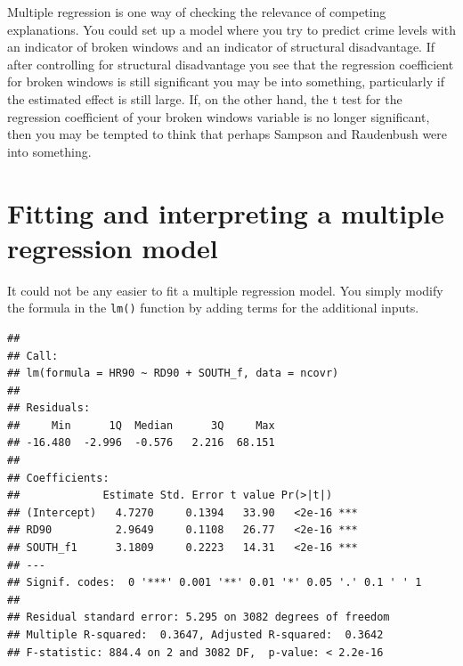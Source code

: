 \documentclass[]{book}
\newenvironment{Shaded}{\begin{snugshade}}{\end{snugshade}}
\newcommand{\DataTypeTok}[1]{\textcolor[rgb]{0.13,0.29,0.53}{#1}}
\newcommand{\DecValTok}[1]{\textcolor[rgb]{0.00,0.00,0.81}{#1}}
\newcommand{\KeywordTok}[1]{\textcolor[rgb]{0.13,0.29,0.53}{\textbf{#1}}}
\newcommand{\NormalTok}[1]{#1}
\newcommand{\OperatorTok}[1]{\textcolor[rgb]{0.81,0.36,0.00}{\textbf{#1}}}
\newcommand{\StringTok}[1]{\textcolor[rgb]{0.31,0.60,0.02}{#1}}
\begin{document}
Multiple regression is one way of checking the relevance of competing explanations. You could set up a model where you try to predict crime levels with an indicator of broken windows and an indicator of structural disadvantage. If after controlling for structural disadvantage you see that the regression coefficient for broken windows is still significant you may be into something, particularly if the estimated effect is still large. If, on the other hand, the t test for the regression coefficient of your broken windows variable is no longer significant, then you may be tempted to think that perhaps Sampson and Raudenbush were into something.

\hypertarget{fitting-and-interpreting-a-multiple-regression-model}{%
\section{Fitting and interpreting a multiple regression model}\label{fitting-and-interpreting-a-multiple-regression-model}}

It could not be any easier to fit a multiple regression model. You simply modify the formula in the \texttt{lm()} function by adding terms for the additional inputs.

\begin{Shaded}
\end{Shaded}

\begin{verbatim}
## 
## Call:
## lm(formula = HR90 ~ RD90 + SOUTH_f, data = ncovr)
## 
## Residuals:
##     Min      1Q  Median      3Q     Max 
## -16.480  -2.996  -0.576   2.216  68.151 
## 
## Coefficients:
##             Estimate Std. Error t value Pr(>|t|)    
## (Intercept)   4.7270     0.1394   33.90   <2e-16 ***
## RD90          2.9649     0.1108   26.77   <2e-16 ***
## SOUTH_f1      3.1809     0.2223   14.31   <2e-16 ***
## ---
## Signif. codes:  0 '***' 0.001 '**' 0.01 '*' 0.05 '.' 0.1 ' ' 1
## 
## Residual standard error: 5.295 on 3082 degrees of freedom
## Multiple R-squared:  0.3647, Adjusted R-squared:  0.3642 
## F-statistic: 884.4 on 2 and 3082 DF,  p-value: < 2.2e-16
\end{verbatim}
\end{document}
